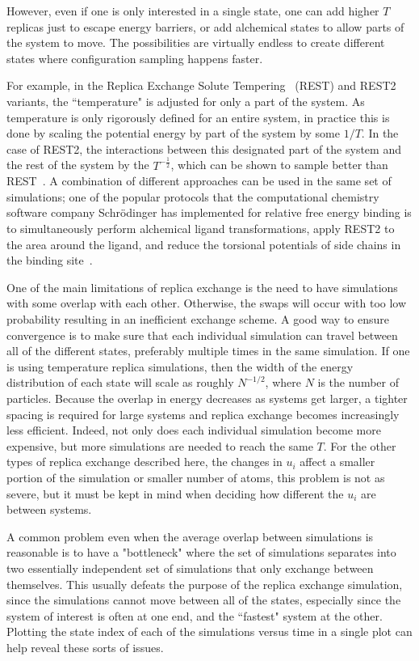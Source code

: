 \documentclass[9pt,review]{livecoms}
\begin{document}
However, even if one is only interested in a single state, one can add higher $T$ replicas just to escape energy barriers, or add alchemical states to allow parts of the system to move. The possibilities are virtually endless to create different states where configuration sampling happens faster.

For example, in the Replica Exchange Solute Tempering~\cite{REST1_Liu_2007} (REST) and REST2~\cite{REST2_Wang_2011} variants, the ``temperature" is adjusted for only a part of the system. As temperature is only rigorously defined for an entire system, in practice this is done by scaling the potential energy by part of the system by some $1/T$. In the case of REST2, the interactions between this designated part of the system and the rest of the system by the $T^{-\frac{1}{2}}$, which can be shown to sample better than REST~\citep{REST2_Wang_2011}. A combination of different approaches can be used in the same set of simulations; one of the popular protocols that the computational chemistry software company Schr\"{o}dinger has implemented for relative free energy binding is to simultaneously perform alchemical ligand transformations, apply REST2 to the area around the ligand, and reduce the torsional potentials of side chains in the binding site~\cite{Wang:JCTC:2013}.

One of the main limitations of replica exchange is the need to have simulations with some overlap with each other.  Otherwise, the swaps will occur with too low probability resulting in an inefficient exchange scheme.  A good way to ensure convergence is to make sure that each individual simulation can travel between all of the different states, preferably multiple times in the same simulation.  If one is using temperature replica simulations, then the width of the energy distribution of each state will scale as roughly $N^{-1/2}$, where $N$ is the number of particles. Because the overlap in energy decreases as systems get larger, a tighter spacing is required for large systems and replica exchange becomes increasingly less efficient. Indeed, not only does each individual simulation become more expensive, but more simulations are needed to reach the
same $T$. For the other types of replica exchange described here, the changes in $u_i$ affect a smaller portion of the simulation or smaller number of atoms, this problem is not as severe, but it must be kept in mind when deciding how different the $u_i$ are between systems.

A common problem even when the average overlap between simulations is reasonable is to have a "bottleneck" where the set of simulations separates into two essentially independent set of simulations that only exchange between themselves. This usually defeats the purpose of the replica exchange simulation, since the simulations cannot move between all of the states, especially since the system of interest is often at one end, and the ``fastest" system at the other. Plotting the state index of each of the simulations versus time in a single plot can help reveal these sorts of issues.
\end{document}
